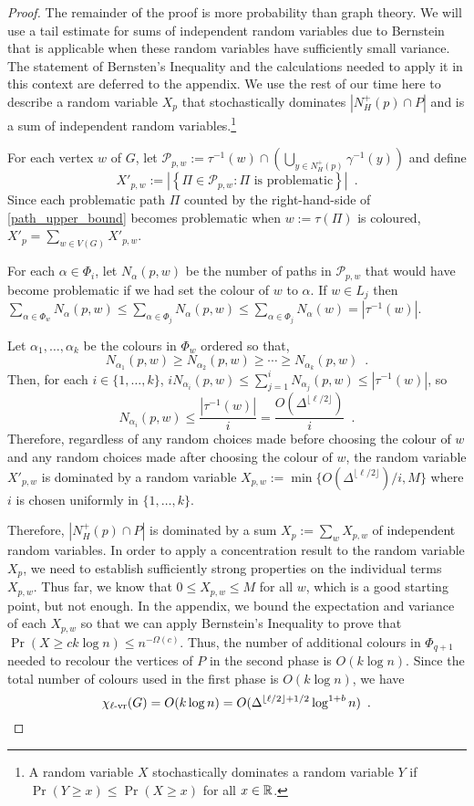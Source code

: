 \documentclass{patmorin}
\newcommand{\rn}[1]{\chi_{\operatorname{#1-vr}}}
\newcommand{\lrn}{\rn{\ell}}
\begin{document}
\begin{proof}
  The remainder of the proof is more probability than graph theory.  We will use a tail estimate for sums of independent random variables due to Bernstein that is applicable when these random variables have sufficiently small variance.  The statement of Bernsten's Inequality and the calculations needed to apply it in this context are deferred to the appendix. We use the rest of our time here to describe a random variable $X_p$ that stochastically dominates $|N^+_H(p)\cap P|$ and is a sum of independent random variables.\footnote{A random variable $X$ stochastically dominates a random variable $Y$ if $\Pr(Y\ge x) \le \Pr(X\ge x)$ for all $x\in\mathbb{R}$.}

  For each vertex $w$ of $G$, let $\mathcal{P}_{p,w}:=\tau^{-1}(w)\cap (\bigcup_{y\in N^+_H(p)}\gamma^{-1}(y))$ and define
  \[
    X'_{p,w} :=\left|\left\{\Pi\in\mathcal{P}_{p,w}:\text{$\Pi$ is problematic}\right\}\right|
    \enspace .
  \]
  Since each problematic path $\Pi$ counted by the right-hand-side of \cref{path_upper_bound} becomes problematic when $w:=\tau(\Pi)$ is coloured, $X'_p=\sum_{w\in V(G)} X'_{p,w}$.

  For each $\alpha\in\Phi_i$, let $N_\alpha(p,w)$ be the number of paths in $\mathcal{P}_{p,w}$ that would have become problematic if we had set the colour of $w$ to $\alpha$. If $w\in L_j$ then $\sum_{\alpha\in\Phi_w} N_\alpha(p,w) \le \sum_{\alpha\in\Phi_j} N_\alpha(p,w) \le \sum_{\alpha\in\Phi_j} N_\alpha(w) = |\tau^{-1}(w)|$.

  Let $\alpha_1,\ldots,\alpha_k$ be the colours in $\Phi_w$ ordered so that,
  \[
    N_{\alpha_1}(p,w) \ge N_{\alpha_2}(p,w) \ge\cdots\ge N_{\alpha_k}(p,w) \enspace .
  \]
  Then, for each $i\in\{1,\ldots,k\}$, $iN_{\alpha_i}(p,w)\le\sum_{j=1}^i N_{\alpha_j}(p,w) \le |\tau^{-1}(w)|$, so
  \[
    N_{\alpha_i}(p,w)\le \frac{|\tau^{-1}(w)|}{i}=\frac{O(\Delta^{\lfloor\ell/2\rfloor})}{i} \enspace .
  \]
  Therefore, regardless of any random choices made before choosing the colour of $w$ and any random choices made after choosing the colour of $w$, the random variable $X'_{p,w}$ is dominated by a random variable $X_{p,w}:=\min\{O(\Delta^{\lfloor\ell/2\rfloor})/i,M\}$ where $i$ is chosen uniformly in $\{1,\ldots,k\}$.

  Therefore, $|N_H^+(p)\cap P|$ is dominated by a sum $X_p:=\sum_{w} X_{p,w}$ of independent random variables.  In order to apply a concentration result to the random variable $X_p$, we need to  establish sufficiently strong properties on the individual terms $X_{p,w}$.  Thus far, we know that $0\le X_{p,w}\le M$ for all $w$, which is a good starting point, but not enough.  In the appendix, we bound the expectation and variance of each $X_{p,w}$ so that we can apply Bernstein's Inequality to prove that $\Pr(X\ge ck\log n)\le n^{-\Omega(c)}$.  Thus, the number of additional colours in $\Phi_{q+1}$ needed to recolour the vertices of $P$ in the second phase is $O(k\log n)$.  Since the total number of colours used in the first phase is $O(k\log n)$, we have
  \[
    \lrn(G) = O(k \log n) = O(\Delta^{\lfloor\ell/2\rfloor+1/2}\log^{1+b} n) \enspace . \qedhere
  \]
\end{proof}
\end{document}
